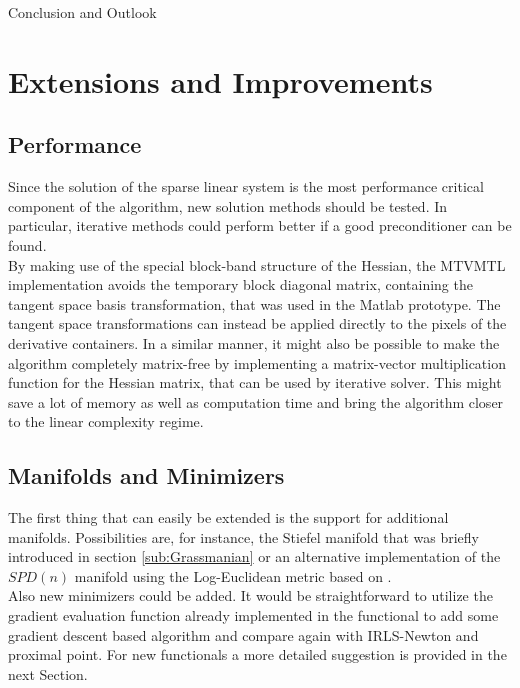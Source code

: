 \begin{chapter}{Conclusion and Outlook}
\section{Extensions and Improvements} %
\label{sec:Extensions}
\subsection{Performance}
Since the solution of the sparse linear system is the most performance critical component of the algorithm, new 
solution methods should be tested. In particular, iterative methods could perform better if a good preconditioner
can be found. \\

By making use of the special block-band structure of the Hessian, the MTVMTL implementation avoids the temporary block diagonal 
matrix, containing the tangent space basis transformation, that was used in the Matlab prototype. The tangent space
transformations can instead be applied directly to the pixels of the derivative containers.
In a similar manner, it might also be possible to make the algorithm completely matrix-free by 
implementing a matrix-vector multiplication function for the Hessian matrix, that can be used by iterative solver.
This might save a lot of memory as well as computation time and bring the algorithm closer to the linear complexity
regime.

\subsection{Manifolds and Minimizers}
The first thing that can easily be extended is the support for additional manifolds. Possibilities are, for instance, the Stiefel manifold that
was briefly introduced in section \ref{sub:Grassmanian} or an alternative implementation of the $SPD(n)$ manifold using the Log-Euclidean metric
based on \cite{LogEuclidian}.\\

Also new minimizers could be added. It would be straightforward to utilize the gradient evaluation function already implemented in the functional to
add some gradient descent based algorithm and compare again with IRLS-Newton and proximal point. For new functionals a more detailed suggestion
is provided in the next Section.


\end{chapter}
